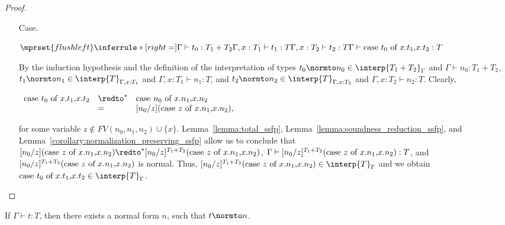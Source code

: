 \begin{proof}
\begin{itemize}
\item[Case.]\ \\
  \begin{center}
    \begin{math}
      $$\mprset{flushleft}
      \inferrule* [right=] {
        \Gamma \vdash t_0:T_1 + T_2
        \\
	\Gamma,x:T_1 \vdash t_1:T
        \\
	\Gamma,x:T_2 \vdash t_2:T
      }{\Gamma \vdash \ccon{t_0}{x}{t_1}{t_2}: T}
    \end{math}
  \end{center}
  By the induction hypothesis and the definition of the interpretation of types
  $t_0 \normto n_0 \in \interp{T_1 + T_2}_\Gamma$ and $\Gamma \vdash n_0:T_1+T_2$, 
  $t_1 \normto n_1 \in \interp{T}_{\Gamma,x:T_1}$ and $\Gamma,x:T_1 \vdash n_1:T$, and
  $t_2 \normto n_2 \in \interp{T}_{\Gamma,x:T_2}$ and  $\Gamma,x:T_2 \vdash n_2:T$.  
  Clearly, 
  \begin{center}
    \begin{math}
      \begin{array}{lll}
        \ccon{t_0}{x}{t_1}{t_2} & \redto^* & \ccon{n_0}{x}{n_1}{n_2}\\
        & =        & [n_0/z](\ccon{z}{x}{n_1}{n_2}),
      \end{array}
    \end{math}
  \end{center}
  for some variable $z \not \in FV(n_0,n_1,n_2) \cup \{x\}$.  Lemma~\ref{lemma:total_ssfp}, 
  Lemma~\ref{lemma:soundness_reduction_ssfp}, and Lemma~\ref{corollary:normalization_preserving_ssfp} 
  allow us to conclude that $[n_0/z](\ccon{z}{x}{n_1}{n_2}) \redto^* [n_0/z]^{T_1+T_2}(\ccon{z}{x}{n_1}{n_2})$,
  $\Gamma \vdash [n_0/z]^{T_1+T_2}(\mbox{case}\ z\ \text{of}\ x\text{.}n_1\text{,}x\text{.}n_2) :T$, and $[n_0/z]^{T_1+T_2}(\mbox{case}\ z\ \text{of}\ x\text{.}n_1\text{,}x\text{.}n_2)$
  is normal.  Thus, $[n_0/z]^{T_1+T_2}(\ccon{z}{x}{n_1}{n_2}) \in \interp{T}_\Gamma$ and we obtain 
  $\ccon{t_0}{x}{t_1}{t_2} \in \interp{T}_\Gamma$. 
\end{itemize}
\end{proof}

\begin{corollary}[Normalization]
  If $\Gamma \vdash t:T$, then there exists a normal form $n$, such
  that $t \normto n$.
\end{corollary}

